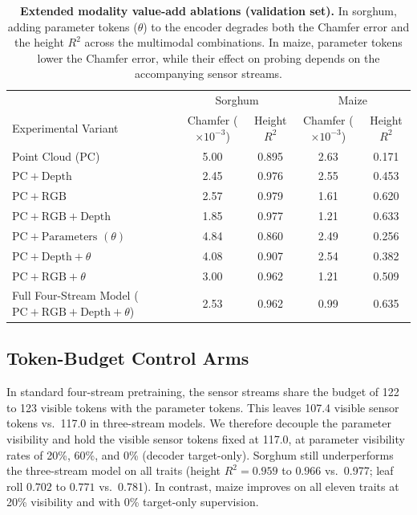 \documentclass[10pt,twocolumn,letterpaper]{article}
\begin{document}
\begin{table}[t]
  \caption{\textbf{Extended modality value-add ablations (validation set).} In sorghum, adding parameter tokens ($\theta$) to the encoder degrades both the Chamfer error and the height $R^2$ across the multimodal combinations. In maize, parameter tokens lower the Chamfer error, while their effect on probing depends on the accompanying sensor streams.}
  \label{tab:supp-e2}
  \centering\small
  \begin{tabular}{lcccc}
  \toprule
   & \multicolumn{2}{c}{Sorghum} & \multicolumn{2}{c}{Maize} \\
  Experimental Variant & Chamfer ($\times10^{-3}$) & Height $R^2$ & Chamfer ($\times10^{-3}$) & Height $R^2$ \\
  \midrule
  Point Cloud ($\mathrm{PC}$) & 5.00 & 0.895 & 2.63 & 0.171 \\
  $\mathrm{PC} + \text{Depth}$ & 2.45 & 0.976 & 2.55 & 0.453 \\
  $\mathrm{PC} + \text{RGB}$ & 2.57 & 0.979 & 1.61 & 0.620 \\
  $\mathrm{PC} + \text{RGB} + \text{Depth}$ & 1.85 & 0.977 & 1.21 & 0.633 \\
  $\mathrm{PC} + \text{Parameters } (\theta)$ & 4.84 & 0.860 & 2.49 & 0.256 \\
  $\mathrm{PC} + \text{Depth} + \theta$ & 4.08 & 0.907 & 2.54 & 0.382 \\
  $\mathrm{PC} + \text{RGB} + \theta$ & 3.00 & 0.962 & 1.21 & 0.509 \\
  Full Four-Stream Model ($\mathrm{PC} + \text{RGB} + \text{Depth} + \theta$) & 2.53 & 0.962 & 0.99 & 0.635 \\
  \bottomrule
  \end{tabular}
\end{table}

\subsection{Token-Budget Control Arms}
In standard four-stream pretraining, the sensor streams share the budget of 122 to 123 visible tokens with the parameter tokens. This leaves 107.4 visible sensor tokens vs.\ 117.0 in three-stream models. We therefore decouple the parameter visibility and hold the visible sensor tokens fixed at 117.0, at parameter visibility rates of 20\%, 60\%, and 0\% (decoder target-only). Sorghum still underperforms the three-stream model on all traits (height $R^2 = 0.959$ to $0.966$ vs.\ 0.977; leaf roll $0.702$ to $0.771$ vs.\ 0.781). In contrast, maize improves on all eleven traits at 20\% visibility and with 0\% target-only supervision.
\end{document}
